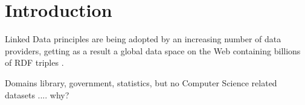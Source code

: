 \section{Introduction}
Linked Data principles are being adopted by an increasing number of data providers, getting as a result a global data space on the Web containing billions of RDF triples \cite{}. 

Domains library, government, statistics, but no Computer Science related datasets .... why?






